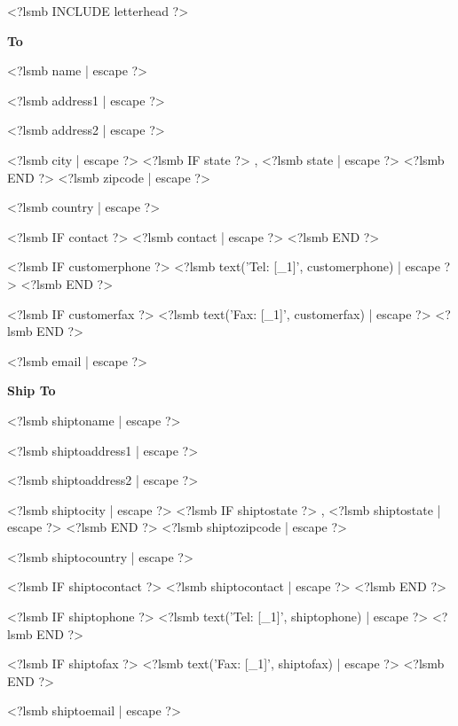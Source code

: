 \documentclass{scrartcl}
\begin{document}
\pagestyle{myheadings}
\thispagestyle{empty}

\fontsize{10pt}{12pt}\selectfont

<?lsmb INCLUDE letterhead ?>



\vspace*{0.5cm}

\parbox[t]{.5\textwidth}{
\textbf{To}
\vspace{0.3cm}

<?lsmb name | escape ?>

<?lsmb address1 | escape ?>

<?lsmb address2 | escape ?>

<?lsmb city | escape ?>
<?lsmb IF state ?>
\hspace{-0.1cm}, <?lsmb state | escape ?>
<?lsmb END ?>
<?lsmb zipcode | escape ?>

<?lsmb country | escape ?>

\vspace{0.3cm}

<?lsmb IF contact ?>
<?lsmb contact | escape ?>
\vspace{0.2cm}
<?lsmb END ?>

<?lsmb IF customerphone ?>
<?lsmb text('Tel: [_1]', customerphone) | escape ?>
<?lsmb END ?>

<?lsmb IF customerfax ?>
<?lsmb text('Fax: [_1]', customerfax) | escape ?>
<?lsmb END ?>

<?lsmb email | escape ?>
}
\parbox[t]{.5\textwidth}{
\textbf{Ship To}
\vspace{0.3cm}

<?lsmb shiptoname | escape ?>

<?lsmb shiptoaddress1 | escape ?>

<?lsmb shiptoaddress2 | escape ?>

<?lsmb shiptocity | escape ?>
<?lsmb IF shiptostate ?>
\hspace{-0.1cm}, <?lsmb shiptostate | escape ?>
<?lsmb END ?>
<?lsmb shiptozipcode | escape ?>

<?lsmb shiptocountry | escape ?>

\vspace{0.3cm}

<?lsmb IF shiptocontact ?>
<?lsmb shiptocontact | escape ?>
\vspace{0.2cm}
<?lsmb END ?>

<?lsmb IF shiptophone ?>
<?lsmb text('Tel: [_1]', shiptophone) | escape ?>
<?lsmb END ?>

<?lsmb IF shiptofax ?>
<?lsmb text('Fax: [_1]', shiptofax) | escape ?>
<?lsmb END ?>

<?lsmb shiptoemail | escape ?>
}
\hfill
\end{document}
